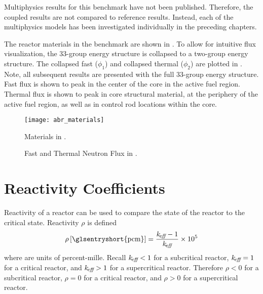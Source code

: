   Multiphysics results for this benchmark have not been published. Therefore,
  the coupled results are not compared to reference results. Instead, each of
  the multiphysics models has been investigated individually in the preceding
  chapters. 

  The reactor materials in the benchmark are shown in . 
  To allow for intuitive flux visualization, the 33-group energy structure is
  collapsed to a two-group energy structure. The collapsed fast ($\phi_1$) and
  collapsed thermal ($\phi_2$) are plotted in .
  Note, all subsequent results are presented with the full 33-group energy
  structure. Fast flux is shown to peak in
  the center of the core in the active fuel region. Thermal flux is shown to
  peak in core structural material, at the periphery of the active fuel region,
  as well as in control rod locations within the core.

  \begin{figure}
    \centering
    \texttt{[image: abr\_materials]}
    \caption{Materials in .}
    \label{fig:abr_materials}
  \end{figure}

  \begin{figure}
    \centering
    \hspace{0.2in}
    \caption{Fast and Thermal Neutron Flux in .}
    \label{fig:abr_fluxes}
  \end{figure}

\section{Reactivity Coefficients}
\label{sec:reactivity_coefficients}
  Reactivity of a reactor can be used to compare the state of the reactor to the
  critical state. Reactivity $\rho$ is defined
  \begin{equation}
    \label{eq:reactivity}
    \rho \units{\glsentryshort{pcm}} = \frac{\keff-1}{\keff} \times 10^5
  \end{equation}
  where  are units of percent-mille.
  Recall $k_{\!\mbox{\scriptsize \em eff}} < 1$ for a subcritical reactor, $k_{\!\mbox{\scriptsize \em eff}}=1$ for a critical
  reactor, and $k_{\!\mbox{\scriptsize \em eff}} > 1$ for a supercritical reactor. Therefore $\rho < 0$
  for a subcritical reactor, $\rho = 0$ for a critical reactor, and $\rho > 0$
  for a supercritical reactor. 


